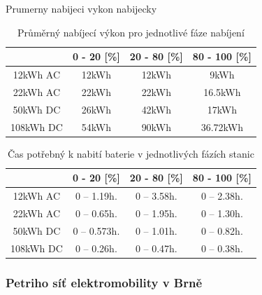 \documentclass[a4paper,11pt]{article}
\begin{document}

Prumerny nabijeci vykon nabijecky
\smallskip

\begin{table}[h!]
    \centering 
    \vspace{0.5cm} %
    \begin{tabular}{|c|c|c|c|}
        \hline
        \textbf{} & \textbf{0 - 20 [\%]} & \textbf{20 - 80 [\%]} & \textbf{80 - 100 [\%]}\\
        \hline
        12kWh AC  &  12kWh  & 12kWh & 9kWh     \\
        \hline
        22kWh AC  &  22kWh  & 22kWh & 16.5kWh  \\
        \hline
        50kWh DC  &  26kWh  & 42kWh & 17kWh    \\
        \hline
        108kWh DC &  54kWh  & 90kWh & 36.72kWh \\
        \hline
    \end{tabular}
    \caption{Průměrný nabíjecí výkon pro jednotlivé fáze nabíjení}
    \label{table:average-charging-power}
    \vspace{0.5cm} %
\end{table}

\begin{table}[h!]
    \centering 
    \vspace{0.5cm} %
    \begin{tabular}{|c|c|c|c|}
        \hline
        \textbf{} & \textbf{0 - 20 [\%]} & \textbf{20 - 80 [\%]} & \textbf{80 - 100 [\%]}\\
        \hline
        12kWh AC  &  0 -- 1.19h.  & 0 -- 3.58h. & 0 -- 2.38h.  \\
        \hline
        22kWh AC  &  0 -- 0.65h.  & 0 -- 1.95h. & 0 -- 1.30h.  \\
        \hline
        50kWh DC  &  0 -- 0.573h. & 0 -- 1.01h. & 0 -- 0.82h.  \\
        \hline
        108kWh DC &  0 -- 0.26h.  & 0 -- 0.47h. & 0 -- 0.38h.  \\
        \hline
    \end{tabular}
    \caption{Čas potřebný k nabití baterie v jednotlivých fázích stanic}
    \label{table:charging-time-consumption}
    \vspace{0.5cm} %
\end{table}


\subsubsection{Petriho síť elektromobility v Brně}
\end{document}
